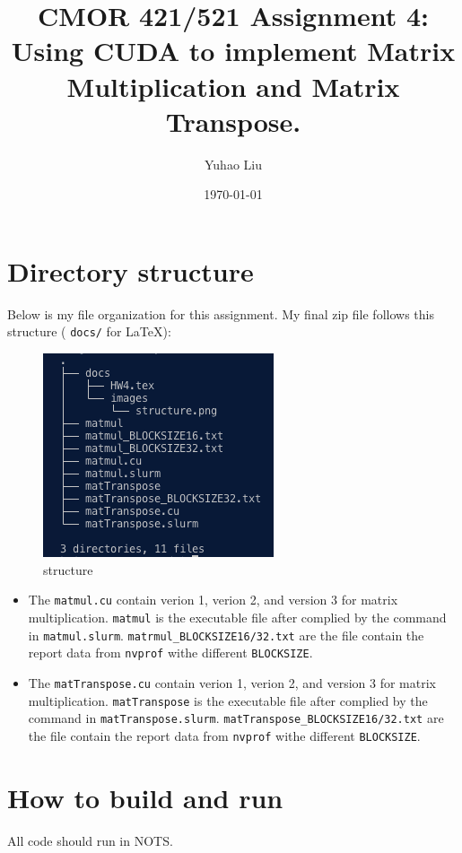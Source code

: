 \documentclass[11pt]{article}
\title{CMOR 421/521 Assignment 4: Using CUDA to implement Matrix Multiplication and Matrix Transpose.}
\author{Yuhao Liu}
\date{\today}
\begin{document}
\maketitle

\tableofcontents
\bigskip

\newpage

\section{Directory structure}
Below is my file organization for this assignment. 
My final zip file follows this structure ( \texttt{docs/} for LaTeX):

\begin{figure}[H]
    \centering
    \includegraphics[width=0.5\linewidth]{Assignments/HW4/docs/images/structure.png}
    \caption{structure}
    \label{fig:structure}
\end{figure}

\begin{itemize}
    \item The \verb|matmul.cu| contain verion 1, verion 2, and version 3 for matrix multiplication. \verb|matmul| is the executable file after complied by the command in \verb|matmul.slurm|. \verb|matrmul_BLOCKSIZE16/32.txt| are the file contain the report data from \verb|nvprof| withe different \verb|BLOCKSIZE|.
    \item The \verb|matTranspose.cu| contain verion 1, verion 2, and version 3 for matrix multiplication. \verb|matTranspose| is the executable file after complied by the command in \verb|matTranspose.slurm|. \verb|matTranspose_BLOCKSIZE16/32.txt| are the file contain the report data from \verb|nvprof| withe different \verb|BLOCKSIZE|.
\end{itemize}

\newpage

\section{How to build and run}
All code should run in NOTS.
\end{document}
